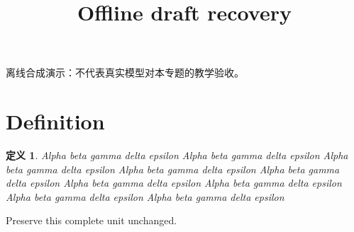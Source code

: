 \documentclass[UTF8,fontset=fandol,11pt]{ctexart}
\title{Offline draft recovery}
\date{}
\newtheorem{definition}{定义}[section]
\begin{document}
\maketitle
\par\noindent 离线合成演示：不代表真实模型对本专题的教学验收。\par
\section{Definition}\label{sec:S01}
\begin{definition}
Alpha beta gamma delta epsilon Alpha beta gamma delta epsilon Alpha beta gamma delta epsilon Alpha beta gamma delta epsilon Alpha beta gamma delta epsilon Alpha beta gamma delta epsilon Alpha beta gamma delta epsilon Alpha beta gamma delta epsilon Alpha beta gamma delta epsilon
\end{definition}
Preserve this complete unit unchanged.\par
\end{document}
